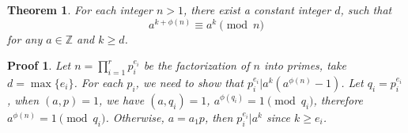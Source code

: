 \documentclass{article}
\newtheorem*{thm}{Theorem}
\newtheorem*{prf}{Proof}
\begin{document}
\begin{thm}
For each integer $n > 1$, there exist a constant integer $d$, 
such that $$a^{k + \phi(n)} \equiv a^k \pmod n$$ for any $a \in \mathbb Z$
and $k \geq d$.
\end{thm}

\begin{prf}
Let $n = \prod_{i=1}^r p_i^{e_i}$ be the factorization of $n$ into primes, 
take $d = \max \{e_i\}$.
For each $p_i$, we need to show that $p_i^{e_i} \vert a^k(a^{\phi(n)} - 1)$.
Let $q_i = p_i^{e_i}$, when $(a, p) = 1$, we have $(a, q_i) = 1$, 
$a^{\phi(q_i)} = 1 \pmod {q_i}$, therefore $a^{\phi(n)} = 1 \pmod {q_i}$. 
Otherwise, $a = a_1 p$, then $p_i^{e_i} \vert a^k$ since $k \geq e_i$.
\end{prf}
\end{document}
